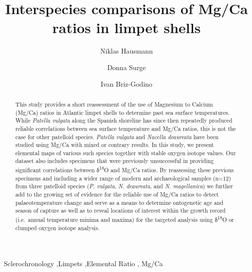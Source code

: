 \documentclass[
  authoryear,
  preprint,
  3p]{elsarticle}
\begin{document}
\begin{frontmatter}
\title{Interspecies comparisons of Mg/Ca ratios in limpet shells}
\author[1]{Niklas Hausmann%
%
}
\author[2]{Donna Surge%
%
}

\author[3]{Ivan Briz-Godino%
%
}






        
\begin{abstract}
This study provides a short reassessment of the use of Magnesium to
Calcium (Mg/Ca) ratios in Atlantic limpet shells to determine past sea
surface temperatures. While \emph{Patella vulgata} along the Spanish
shoreline has since then repeatedly produced reliable correlations
between sea surface temperature and Mg/Ca ratios, this is not the case
for other patelloid species. \emph{Patella vulgata} and \emph{Nacella
deaureata} have been studied using Mg/Ca with mixed or contrary results.
In this study, we present elemental maps of various such species
together with stable oxygen isotope values. Our dataset also includes
specimens that were previously unsuccessful in providing significant
correlations between δ\textsuperscript{18}O and Mg/Ca ratios. By
reassessing these previous specimens and including a wider range of
modern and archaeological samples (n=12) from three patelloid species
(\emph{P. vulgata}, \emph{N. deaureata}, and \emph{N. magellanica}) we
further add to the growing set of evidence for the reliable use of Mg/Ca
ratios to detect palaeotemperature change and serve as a means to
determine ontogenetic age and season of capture as well as to reveal
locations of interest within the growth record (i.e.~annual temperature
minima and maxima) for the targeted analysis using
δ\textsuperscript{18}O or clumped oxygen isotope analysis.
\end{abstract}





\begin{keyword}
    Sclerochronology \sep Limpets \sep Elemental Ratio \sep 
    Mg/Ca
\end{keyword}
\end{frontmatter}
    
\end{document}
